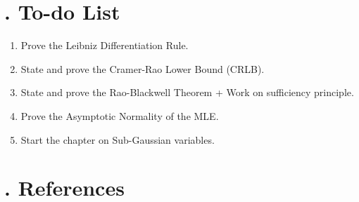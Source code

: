 \newpage

\listoftheorems[ignoreall,show=dfn]

\setcounter{section}{2}


\newpage\section{. To-do List}
\begin{enumerate}
	\item Prove the Leibniz Differentiation Rule.
	\item State and prove the Cramer-Rao Lower Bound (CRLB).
	\item State and prove the Rao-Blackwell Theorem + Work on sufficiency principle.
	\item Prove the Asymptotic Normality of the MLE.
	\item Start the chapter on Sub-Gaussian variables.
\end{enumerate} 

\newpage
\section{. References}
\nocite{*}
\printbibliography